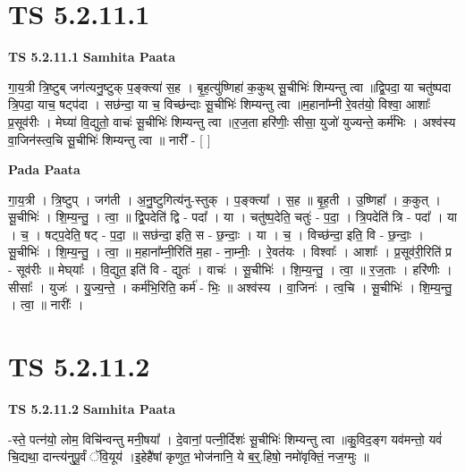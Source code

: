 \documentclass[17pt]{extarticle}
\begin{document}
\section*{ TS 5.2.11.1 }

\textbf{TS 5.2.11.1 } \newline
\textbf{Samhita Paata} \newline

गा॒य॒त्री त्रि॒ष्टुब् जग॑त्यनु॒ष्टुक् प॒ङ्क्त्या॑ स॒ह । बृ॒ह॒त्यु॑ष्णिहा॑ क॒कुथ् सू॒चीभिः॑ शिम्यन्तु त्वा ॥द्वि॒पदा॒ या चतु॑ष्पदा त्रि॒पदा॒ याच॒ षट्प॑दा । सछ॑न्दा॒ या च॒ विच्छ॑न्दाः सू॒चीभिः॑ शिम्यन्तु त्वा ॥म॒हाना᳚म्नी रे॒वत॑यो॒ विश्वा॒ आशाः᳚ प्र॒सूव॑रीः । मेघ्या॑ वि॒द्युतो॒ वाचः॑ सू॒चीभिः॑ शिम्यन्तु त्वा ॥र॒ज॒ता हरि॑णीः॒ सीसा॒ युजो॑ युज्यन्ते॒ कर्म॑भिः । अश्व॑स्य वा॒जिन॑स्त्व॒चि सू॒चीभिः॑ शिम्यन्तु त्वा ॥ नारी᳚ - [  ] \newline

\textbf{Pada Paata} \newline

गा॒य॒त्री । त्रि॒ष्टुप् । जग॑ती । अ॒नु॒ष्टुगित्य॑नु-स्तुक् । प॒ङ्क्त्या᳚ । स॒ह ॥ बृ॒ह॒ती । उ॒ष्णिहा᳚ । क॒कुत् । सू॒चीभिः॑ । शि॒म्य॒न्तु॒ । त्वा॒ ॥ द्वि॒पदेति॑ द्वि - पदा᳚ । या । चतु॑ष्प॒देति॒ चतुः॑ - प॒दा॒ । त्रि॒पदेति॑ त्रि - पदा᳚ । या । च॒ । षट्प॒देति॒ षट् - प॒दा॒ ॥ सछ॑न्दा॒ इति॒ स - छ॒न्दाः॒ । या । च॒ । विच्छ॑न्दा॒ इति॒ वि - छ॒न्दाः॒ । सू॒चीभिः॑ । शि॒म्य॒न्तु॒ । त्वा॒ ॥ म॒हाना᳚म्नी॒रिति॑ म॒हा - ना॒म्नीः॒ । रे॒वत॑यः । विश्वाः᳚ । आशाः᳚ । प्र॒सूव॑री॒रिति॑ प्र - सूव॑रीः ॥ मेघ्‌याः᳚ । वि॒द्युत॒ इति॑ वि - द्युतः॑ । वाचः॑ । सू॒चीभिः॑ । शि॒म्य॒न्तु॒ । त्वा॒ ॥ र॒ज॒ताः । हरि॑णीः । सीसाः᳚ । युजः॑ । यु॒ज्य॒न्ते॒ । कर्म॑भि॒रिति॒ कर्म॑ -  भिः॒ ॥ अश्व॑स्य । वा॒जिनः॑ । त्व॒चि । सू॒चीभिः॑ । शि॒म्य॒न्तु॒ । त्वा॒ ॥ नारीः᳚ ।  \newline




\section*{ TS 5.2.11.2 }

\textbf{TS 5.2.11.2 } \newline
\textbf{Samhita Paata} \newline

-स्ते॒ पत्न॑यो॒ लोम॒ विचि॑न्वन्तु मनी॒षया᳚ । दे॒वानां॒ पत्नी॒र्दिशः॑ सू॒चीभिः॑ शिम्यन्तु त्वा ॥कु॒विद॒ङ्ग यव॑मन्तो॒ यवं॑ चि॒द्यथा॒ दान्त्य॑नुपू॒र्वं ॅवि॒यूय॑ ।इ॒हेहै॑षां कृणुत॒ भोज॑नानि॒ ये ब॒र्॒.हिषो॒ नमो॑वृक्तिं॒ नज॒ग्मुः ॥ \newline
\end{document}
